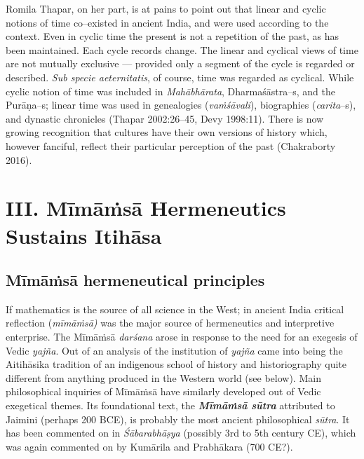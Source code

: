 Romila Thapar, on her part, is at pains to point out that linear and cyclic notions of time co–existed in ancient India, and were used according to the context. Even in cyclic time the present is not a repetition of the past, as has been maintained. Each cycle records change. The linear and cyclical views of time are not mutually exclusive — provided only a segment of the cycle is regarded or described. \textit{Sub specie aeternitatis}, of course, time was regarded as cyclical. While cyclic notion of time was included in \textit{Mahābhārata}, Dharmaśāstra–s, and the Purāṇa–s; linear time was used in genealogies (\textit{vaṁśāvali}), biographies (\textit{carita}–s), and dynastic chronicles (Thapar 2002:26–45, Devy 1998:11). There is now growing recognition that cultures have their own versions of history which, however fanciful, reflect their particular perception of the past (Chakraborty 2016).


\section*{III. Mīmāṁsā Hermeneutics Sustains Itihāsa}

\subsection*{Mīmāṁsā hermeneutical principles}

If mathematics is the source of all science in the West; in ancient India critical reflection (\textit{mīmāṁsā)} was the major source of hermeneutics and interpretive enterprise. The Mīmāṁsā \textit{darśana} arose in response to the need for an exegesis of Vedic \textit{yajña}. Out of an analysis of the institution of \textit{yajña} came into being the Aitihāsika tradition of an indigenous school of history and historiography quite different from anything produced in the Western world (see below). Main philosophical inquiries of Mīmāṁsā have similarly developed out of Vedic exegetical themes. Its foundational text, the \textbf{\textit{Mīmāṁsā sūtra}} attributed to Jaimini (perhaps 200 BCE), is probably the most ancient philosophical \textit{sūtra}. It has been commented on in \textit{Śābarabhāṣya} (possibly 3rd to 5th century CE), which was again commented on by Kumārila and Prabhākara (700 CE?).

